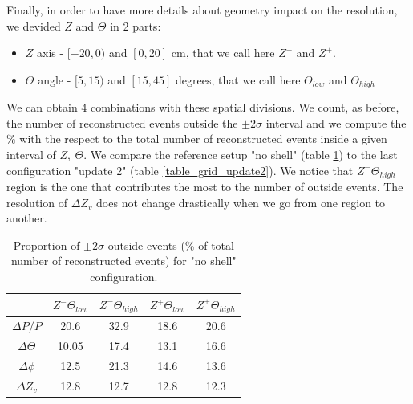 \documentclass[11pt,a4paper,english]{article}
\begin{document}
Finally, in order to have more details about geometry impact on the resolution, we devided $Z$ and $\Theta$ in 2 parts:
\begin{itemize}
	\item $Z$ axis - $[-20, 0)$ and $[0, 20]$ cm, that we call here $Z^{-}$ and $Z^{+}$.
	\item $\Theta$ angle - $[5, 15)$ and $[15, 45]$ degrees, that we call here $\Theta_{low}$ and $\Theta_{high}$
\end{itemize}
We can obtain 4 combinations with these spatial divisions. We count, as before, the number of reconstructed events outside the $\pm 2 \sigma$ interval and we compute the $\%$ with the respect to the total number of reconstructed events inside a given interval of $Z, \ \Theta$. We compare the reference setup "no shell" (table \ref{table_grid_noshell}) to the last configuration "update 2" (table \ref{table_grid_update2}).
We notice that $Z^{-} \Theta_{high}$ region is the one that contributes the most to the number of outside events. 
The resolution of $\Delta Z_v$ does not change drastically when we go from one region to another.

\begin{table}[h!]
\centering
\begin{tabular}{|c|c|c|c|c|}
\hline
                     & \textbf{$Z^{-} \Theta_{low}$} & \textbf{$Z^{-} \Theta_{high}$} & \textbf{$Z^{+} \Theta_{low}$} & \textbf{$Z^{+} \Theta_{high}$} \\ \hline
\textbf{$\Delta P/P$}   & 20.6                  & 32.9                   & 18.6                  & 20.6                   \\ \hline
\textbf{$\Delta \Theta$} & 10.05                 & 17.4                   & 13.1                  & 16.6                   \\ \hline
\textbf{$\Delta \phi$}   & 12.5                  & 21.3                   & 14.6                  & 13.6                   \\ \hline
\textbf{$\Delta Z_v$}    & 12.8                  & 12.7                   & 12.8                  & 12.3                   \\ \hline
\end{tabular}
\caption{Proportion of $\pm 2\sigma$ outside events (\% of total number of reconstructed events) for "no shell" configuration.}
\label{table_grid_noshell}
\end{table}
\end{document}
